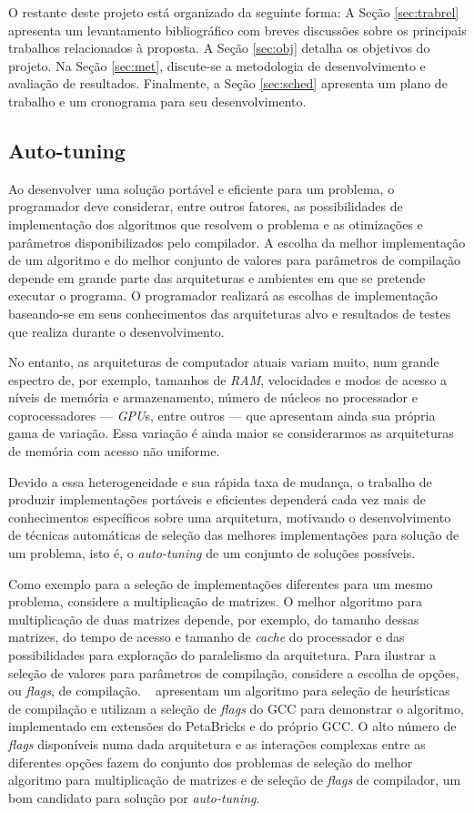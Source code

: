 \documentclass[a4paper, 12pt]{article}
\begin{document}
O restante deste projeto está organizado da seguinte forma:
A Seção \ref{sec:trabrel} apresenta um levantamento bibliográfico com breves
discussões sobre os principais trabalhos relacionados à proposta.
A Seção \ref{sec:obj} detalha os objetivos do projeto. Na Seção
\ref{sec:met}, discute-se a metodologia de desenvolvimento e avaliação de
resultados. Finalmente, a Seção \ref{sec:sched} apresenta um plano de trabalho
e um cronograma para seu desenvolvimento.

\subsection{Auto-tuning} \label{sec:auto-tuning}

Ao desenvolver uma solução portável e eficiente para um problema, o
programador deve considerar, entre outros fatores, as possibilidades
de implementação dos algoritmos que resolvem o problema e as otimizações e
parâmetros disponibilizados pelo compilador.
A escolha da melhor implementação de um algoritmo e do melhor conjunto de
valores para parâmetros de compilação depende em grande parte das arquiteturas
e ambientes em que se pretende executar o programa. O programador realizará
as escolhas de implementação baseando-se em seus conhecimentos das arquiteturas
alvo e resultados de testes que realiza durante o desenvolvimento.

No entanto, as arquiteturas de computador atuais variam muito, num grande
espectro de, por exemplo, tamanhos de \emph{RAM},
velocidades e modos de acesso a níveis de memória e armazenamento, número de
núcleos no processador e coprocessadores --- \emph{GPU}s, entre outros
--- que apresentam ainda sua própria gama de variação. Essa variação é
ainda maior se considerarmos as arquiteturas de memória com acesso
não uniforme.

Devido a essa heterogeneidade e sua rápida taxa de mudança,
o trabalho de produzir implementações portáveis e eficientes
dependerá cada vez mais de conhecimentos específicos sobre uma arquitetura,
motivando o desenvolvimento de técnicas automáticas de seleção das melhores
implementações para solução de um problema, isto é, o \emph{auto-tuning} de um
conjunto de soluções possíveis.

Como exemplo para a seleção de implementações diferentes para um mesmo
problema, considere a multiplicação de matrizes. O melhor algoritmo
para multiplicação de duas matrizes depende, por exemplo, do tamanho dessas
matrizes, do tempo de acesso e tamanho de \textit{cache} do processador e das
possibilidades para exploração do paralelismo da arquitetura.
Para ilustrar a seleção de valores para parâmetros de compilação, considere
a escolha de opções, ou \emph{flags}, de compilação.
~\citet{tartara2013heuristics} apresentam um algoritmo para seleção de
heurísticas de compilação e utilizam a seleção de \emph{flags}
do GCC para demonstrar o algoritmo, implementado em extensões do PetaBricks e
do próprio GCC.
O alto número de \emph{flags} disponíveis numa dada arquitetura e as interações
complexas entre as diferentes opções fazem do conjunto dos problemas de
seleção do melhor algoritmo para multiplicação de matrizes e de seleção de
\emph{flags} de compilador, um bom candidato para solução por
\emph{auto-tuning}.
\end{document}
